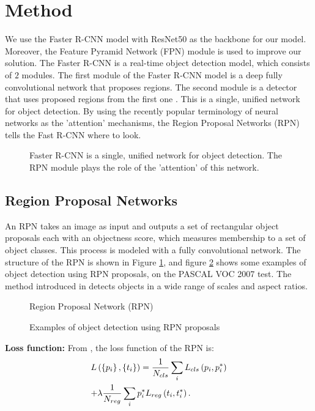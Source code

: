 \section{Method}
We use the Faster R-CNN model with ResNet50 as the backbone for our model. Moreover, the Feature Pyramid Network (FPN) module is used to improve our solution. The Faster R-CNN is a real-time object detection model, which consists of $2$ modules. The first module of the Faster R-CNN model is a deep fully convolutional network that proposes regions. The second module is a detector that uses proposed regions from the first one \cite{f-rcnn}. This is a single, unified network for object detection. By using the recently popular terminology of neural networks as the 'attention' mechanisms, the Region Proposal Networks (RPN) tells the Fast R-CNN where to look.

\begin{figure}[H]
\caption{Faster R-CNN is a single, unified network for object detection. The RPN module plays the role of the 'attention' of this network.}
\end{figure}

\subsection{Region Proposal Networks}
An RPN takes an image as input and outputs a set of rectangular object proposals each with an objectness score, which measures membership to a set of object classes. This process is modeled with a fully convolutional network. The structure of the RPN is shown in Figure \ref{rpn}, and figure \ref{rpn_example} shows some examples of object detection using RPN proposals, on the PASCAL VOC 2007 test. The method introduced in  \cite{f-rcnn} detects objects in a wide range of scales and aspect ratios.

\begin{figure}[H]
\caption{Region Proposal Network (RPN)}
\label{rpn}
\end{figure}

\begin{figure}[H]
\caption{Examples of object detection using RPN proposals}
\label{rpn_example}
\end{figure}

\textbf{Loss function:} From \cite{f-rcnn}, the loss function of the RPN is:
$$\begin{gathered}
L\left( {\left\{ {{p_i}} \right\},\left\{ {{t_i}} \right\}} \right) = \frac{1}{{{N_{cls}}}}\sum\limits_i {{L_{cls}}\left( {{p_i},p_i^*} \right)}  \hfill \\
 + \lambda \frac{1}{{{N_{reg}}}}\sum\limits_i {p_i^*} {L_{reg}}\left( {{t_i},t_i^*} \right). \hfill \\
\end{gathered} $$

